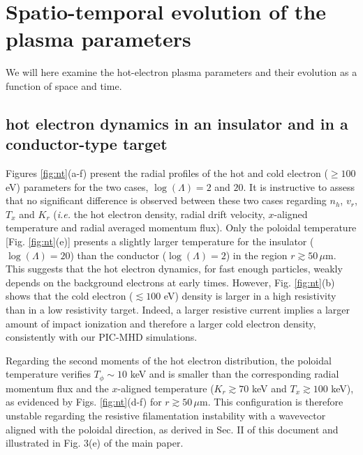 \documentclass[aps,showpacs,superscriptaddress]{revtex4}
\begin{document}
\section{Spatio-temporal evolution of the plasma parameters}
We will here examine the hot-electron plasma parameters and their evolution as a function of space and time. 

\subsection{hot electron dynamics in an insulator and in a conductor-type target} 
Figures \ref{fig:nt}(a-f) present the radial profiles of the hot and cold electron ($\ge 100$ eV) parameters for the two cases, $\log(\Lambda)=2$ and $20$. 
It is instructive to assess that no significant difference is observed between these two cases regarding $n_h$, $v_r$, $T_x$ and $K_r$ (\emph{i.e.} the hot electron density, radial drift velocity, $x$-aligned temperature and radial averaged momentum flux). Only the poloidal temperature [Fig. \ref{fig:nt}(e)] presents a slightly larger temperature for the insulator ($\log(\Lambda)=20$)  than the conductor ($\log(\Lambda)=2$) in the region $r\gtrsim 50\, \mu$m. 
This suggests that the hot electron dynamics, for fast enough particles, weakly depends on the background electrons at early times.
However, Fig. \ref{fig:nt}(b) shows that the cold electron ($\lesssim 100$ eV) density is larger in a high resistivity than in a low resistivity target. Indeed, a larger resistive current implies a larger amount of impact ionization and therefore a larger cold electron density, consistently with our PIC-MHD simulations. 

Regarding the second moments of the hot electron distribution, 
the   poloidal  temperature verifies $T_\phi\sim 10$ keV and  is  smaller than the corresponding radial momentum flux and the $x$-aligned temperature ($K_r\gtrsim 70$ keV and $T_x\gtrsim 100$ keV),  as evidenced by Figs. \ref{fig:nt}(d-f) for $r\gtrsim 50\, \mu$m. This configuration is therefore unstable regarding the resistive filamentation instability with a wavevector aligned with the poloidal direction, as derived in Sec. II of this document and illustrated in Fig. 3(e) of the main paper.
\end{document}
